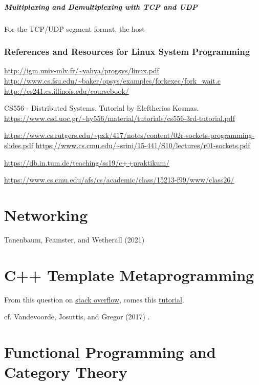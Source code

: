 \documentclass[10pt]{amsart}
\begin{document}
\begin{multicols*}{2}
\subsubsection{Multiplexing and Demultiplexing with TCP and UDP}

For the TCP/UDP segment format, the host


\section{References and Resources for Linux System Programming}

\url{http://igm.univ-mlv.fr/~yahya/progsys/linux.pdf} \\
\url{http://www.cs.fsu.edu/~baker/opsys/examples/forkexec/fork_wait.c} \\
\url{http://cs241.cs.illinois.edu/coursebook/}

CS556 - Distributed Systems. Tutorial by Eleftherios Kosmas.
\url{https://www.csd.uoc.gr/~hy556/material/tutorials/cs556-3rd-tutorial.pdf}


\url{https://www.cs.rutgers.edu/~pxk/417/notes/content/02r-sockets-programming-slides.pdf}
\url{https://www.cs.cmu.edu/~srini/15-441/S10/lectures/r01-sockets.pdf}

\url{https://db.in.tum.de/teaching/ss19/c++praktikum/}

\url{https://www.cs.cmu.edu/afs/cs/academic/class/15213-f99/www/class26/}

\part{Networking}

Tanenbaum, Feamster, and Wetherall (2021) \cite{TFW2021}



\part{C++ Template Metaprogramming}

From this question on \href{https://stackoverflow.com/questions/112277/best-introduction-to-c-template-metaprogramming}{stack overflow}, comes this \href{http://www.cs.rpi.edu/~musser/design/blitz/meta-art.html}{tutorial}. 

cf. Vandevoorde, Josuttis, and Gregor (2017) \cite{VJG2017}. 

\part{Functional Programming and Category Theory}


\end{multicols*}
\end{document}
